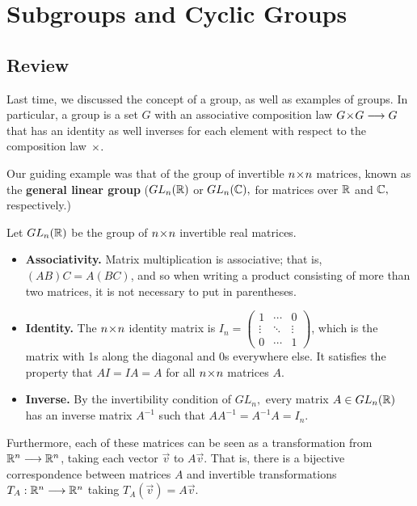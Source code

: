 
\section{Subgroups and Cyclic Groups}
\subsection{Review}
Last time, we discussed the concept of a group, as well as examples of groups. In particular, a group is a set $G$ with an associative composition law $G \hspace{0.05em}{\times}\hspace{0.05em} G \longrightarrow G$ that has an identity as well inverses for each element with respect to the composition law $\hspace{0.05em}{\times}\hspace{0.05em}.$ 

Our guiding example was that of the group of invertible $n \hspace{0.05em}{\times}\hspace{0.05em} n$ matrices, known as the \textbf{general linear group} ($GL_n(\mathbb R)$ or $GL_n(\mathbb C),$ for matrices over $\mathbb R$ and $\mathbb C,$ respectively.) 
\begin{example}
Let $GL_n(\mathbb R)$ be the group of $n \hspace{0.05em}{\times}\hspace{0.05em} n$ invertible real matrices. 
\begin{itemize}
    \item \textbf{Associativity.} Matrix multiplication is associative; that is, $(AB)C = A(BC)$, and so when writing a product consisting of more than two matrices, it is not necessary to put in parentheses. 
    \item \textbf{Identity.} The $n \hspace{0.05em}{\times}\hspace{0.05em} n$ identity matrix is $I_n = \begin{pmatrix}1 & \cdots & 0 \\ \vdots & \ddots & \vdots \\ 0 & \cdots & 1\end{pmatrix}$, which is the matrix with 1s along the diagonal and 0s everywhere else. It satisfies the property that $AI = IA = A$ for all $n \hspace{0.05em}{\times}\hspace{0.05em} n$ matrices $A$. 
    \item \textbf{Inverse.} By the invertibility condition of $GL_n,$ every matrix $A \in GL_n(\mathbb R)$ has an inverse matrix $A^{-1}$ such that $AA^{-1} = A^{-1}A = I_n.$
\end{itemize}
\end{example}
Furthermore, each of these matrices can be seen as a transformation from $\mathbb R^n \longrightarrow \mathbb R^n$, taking each vector $\vec{v}$ to $A\vec{v}.$ That is, there is a bijective correspondence between matrices $A$ and invertible transformations $T_A: \mathbb R^n \longrightarrow \mathbb R^n$ taking $T_A(\vec{v}) = A\vec{v}.$


